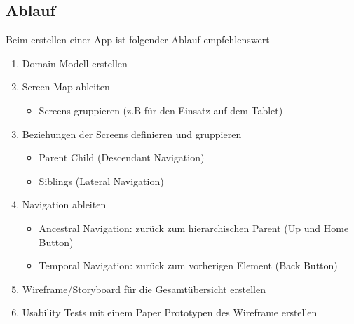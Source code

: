 \subsection{Ablauf}
Beim erstellen einer App ist folgender Ablauf empfehlenswert
\begin{enumerate}
	\item Domain Modell erstellen
	\item Screen Map ableiten
	\begin{itemize}
		\item Screens gruppieren (z.B für den Einsatz auf dem Tablet)
	\end{itemize}
	\item Beziehungen der Screens definieren und gruppieren
	\begin{itemize}
		\item Parent Child (Descendant Navigation)
		\item Siblings (Lateral Navigation)
	\end{itemize}
	\item Navigation ableiten
	\begin{itemize}
		\item Ancestral Navigation: zurück zum hierarchischen Parent (Up und Home Button)
		\item Temporal Navigation: zurück zum vorherigen Element (Back Button)
	\end{itemize}
	\item Wireframe/Storyboard für die Gesamtübersicht erstellen
	\item Usability Tests mit einem Paper Prototypen des Wireframe erstellen
\end{enumerate}

